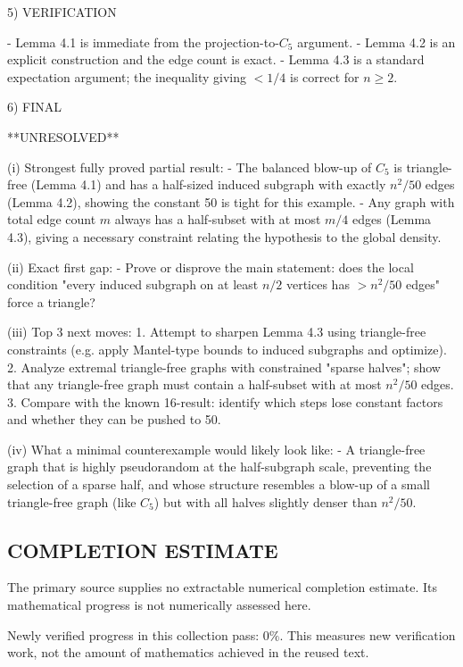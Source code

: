 5) VERIFICATION

- Lemma 4.1 is immediate from the projection-to-$C_5$ argument.
- Lemma 4.2 is an explicit construction and the edge count is exact.
- Lemma 4.3 is a standard expectation argument; the inequality giving $<1/4$ is correct for $n\ge 2$.

6) FINAL

**UNRESOLVED**

(i) Strongest fully proved partial result:
- The balanced blow-up of $C_5$ is triangle-free (Lemma 4.1) and has a half-sized induced subgraph with exactly $n^2/50$ edges (Lemma 4.2), showing the constant 50 is tight for this example.
- Any graph with total edge count $m$ always has a half-subset with at most $m/4$ edges (Lemma 4.3), giving a necessary constraint relating the hypothesis to the global density.

(ii) Exact first gap:
- Prove or disprove the main statement: does the local condition "every induced subgraph on at least $n/2$ vertices has $>n^2/50$ edges" force a triangle?

(iii) Top 3 next moves:
1. Attempt to sharpen Lemma 4.3 using triangle-free constraints (e.g. apply Mantel-type bounds to induced subgraphs and optimize).
2. Analyze extremal triangle-free graphs with constrained "sparse halves"; show that any triangle-free graph must contain a half-subset with at most $n^2/50$ edges.
3. Compare with the known 16-result: identify which steps lose constant factors and whether they can be pushed to 50.

(iv) What a minimal counterexample would likely look like:
- A triangle-free graph that is highly pseudorandom at the half-subgraph scale, preventing the selection of a sparse half, and whose structure resembles a blow-up of a small triangle-free graph (like $C_5$) but with all halves slightly denser than $n^2/50$.




\subsection*{COMPLETION ESTIMATE}
The primary source supplies no extractable numerical completion estimate. Its mathematical progress is not numerically assessed here.

Newly verified progress in this collection pass: $0\%$. This measures new verification work, not the amount of mathematics achieved in the reused text.

